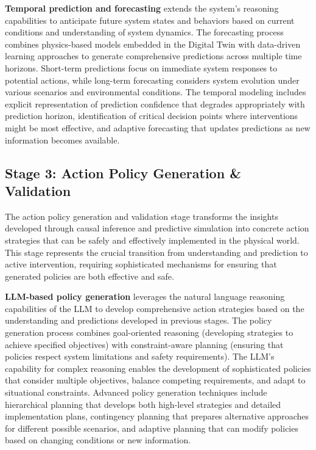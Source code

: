 \textbf{Temporal prediction and forecasting} extends the system's reasoning capabilities to anticipate future system states and behaviors based on current conditions and understanding of system dynamics. The forecasting process combines physics-based models embedded in the Digital Twin with data-driven learning approaches to generate comprehensive predictions across multiple time horizons. Short-term predictions focus on immediate system responses to potential actions, while long-term forecasting considers system evolution under various scenarios and environmental conditions. The temporal modeling includes explicit representation of prediction confidence that degrades appropriately with prediction horizon, identification of critical decision points where interventions might be most effective, and adaptive forecasting that updates predictions as new information becomes available.

\subsection{Stage 3: Action Policy Generation \& Validation}

The action policy generation and validation stage transforms the insights developed through causal inference and predictive simulation into concrete action strategies that can be safely and effectively implemented in the physical world. This stage represents the crucial transition from understanding and prediction to active intervention, requiring sophisticated mechanisms for ensuring that generated policies are both effective and safe.

\textbf{LLM-based policy generation} leverages the natural language reasoning capabilities of the LLM to develop comprehensive action strategies based on the understanding and predictions developed in previous stages. The policy generation process combines goal-oriented reasoning (developing strategies to achieve specified objectives) with constraint-aware planning (ensuring that policies respect system limitations and safety requirements). The LLM's capability for complex reasoning enables the development of sophisticated policies that consider multiple objectives, balance competing requirements, and adapt to situational constraints. Advanced policy generation techniques include hierarchical planning that develops both high-level strategies and detailed implementation plans, contingency planning that prepares alternative approaches for different possible scenarios, and adaptive planning that can modify policies based on changing conditions or new information.


